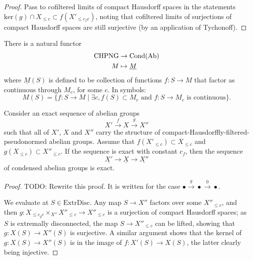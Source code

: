 \begin{proof}
  \leanok
  Pass to cofiltered limits of compact Hausdorff spaces in the statements $\mathrm{ker}(g)\cap X_{\leq c}\subset f(X'_{\leq c_fc})$,
  noting that cofiltered limits of surjections of compact Hausdorff spaces are still surjective (by an application of Tychonoff).
\end{proof}

\begin{definition}
  \label{CHPNG-to-Cond}
  \leanok
  There is a natural functor
  \begin{align*}
    \text{CHPNG} &\to \operatorname{Cond}(\operatorname{Ab}) \\
    M &\mapsto \underline{M}
  \end{align*}
  where $\underline{M}(S)$ is defined to be collection of functions $f \colon S \to M$ that factor as continuous through $M_c$, for some $c$.
  In symbols:
  \[ M(S) = \{f \colon S \to M \mid \exists c, f(S) \subset M_c \text{ and $f \colon S \to M_c$ is continuous}\}. \]
\end{definition}

\begin{proposition}
  \label{CHPNG-Cond-exact}
  \leanok
  Consider an exact sequence of abelian groups
  \[ X'\xrightarrow{f} X\xrightarrow{g} X'' \]
  such that all of $X'$, $X$ and $X''$ carry the structure of compact-Hausdorffly-filtered-pseudonormed abelian groups.
  Assume that $f(X'_{\leq c})\subset X_{\leq c}$ and $g(X_{\leq c})\subset X''_{\leq c}$.
  If the sequence is exact with constant $c_f$,
  then the sequence
  \[ \underline{X'}\to \underline{X}\to \underline{X''} \]
  of condensed abelian groups is exact.
\end{proposition}

\begin{proof}
  \leanok
  TODO: Rewrite this proof. It is written for the case $\bullet \stackrel{g}{\to} \bullet \stackrel{0}{\to} \bullet$.

  We evaluate at $S\in \mathrm{ExtrDisc}$.
  Any map $S\to X''$ factors over some $X''_{\leq c}$,
  and then $g: X_{\leq c_gc}\times_{X''} X''_{\leq c}\to X''_{\leq c}$ is a surjection of compact Hausdorff spaces;
  as $S$ is extremally disconnected, the map $S\to X''_{\leq c}$ can be lifted,
  showing that $g: X(S)\to X''(S)$ is surjective.
  A similar argument shows that the kernel of $g: X(S)\to X''(S)$ is in the image of $f: X'(S)\to X(S)$,
  the latter clearly being injective.
\end{proof}

